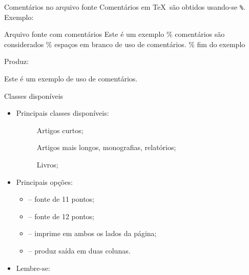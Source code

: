 \begin{frame}{Comentários no arquivo fonte}
	Comentários em \TeX\ são obtidos usando-se \texttt{\%}.
	\pause
	Exemplo:
	\begin{Codigo}{Arquivo fonte com comentários}
		Este é um exemplo\n
		\% comentários são considerados\n
		\% espaços em branco\n
		de uso de comentários. \% fim do exemplo
	\end{Codigo}

	\pause
	Produz:
	\begin{Resultado}{}
		Este é um exemplo
		de uso de comentários. %
	\end{Resultado}
\end{frame}

\begin{frame}{Classes disponíveis}
	\begin{itemize}
		\item Principais classes disponíveis:
		\pause
		\begin{description}
			\item [] Artigos curtos;
			\pause			
			\item [] Artigos mais longos, monografias, relatórios;
			\pause
			\item [] Livros;
		\end{description}

\medskip

		\pause
		\item Principais opções: 

\medskip

		\begin{itemize}
			\pause
			\item \Lopt{11pt} -- fonte de 11 pontos;
			\pause
			\item \Lopt{12pt} -- fonte de 12 pontos;
			\pause
			\item {} -- imprime em ambos os lados da página;
			\pause
			\item {} -- produz saída em duas colunas.
		\end{itemize}

\medskip
		\pause
		\item Lembre-se: 
	\end{itemize}
\end{frame}

